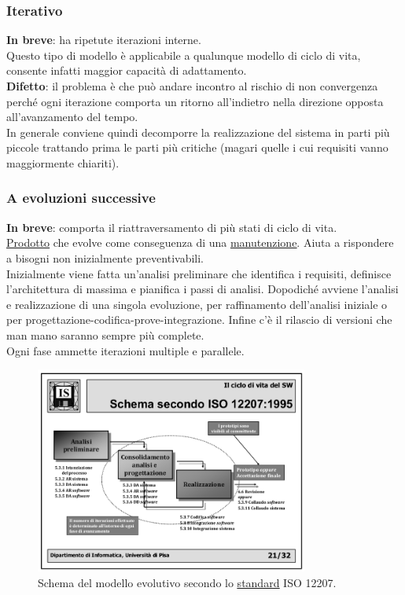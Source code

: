 			\subsubsection{Iterativo}  \label{miterativo}
			\textbf{In breve}: ha ripetute iterazioni interne. \\
			Questo tipo di modello è applicabile a qualunque modello di ciclo di vita, consente infatti maggior capacità di adattamento. \\
			\textbf{Difetto}: il problema è che può andare incontro al rischio di non convergenza perché ogni iterazione comporta un ritorno all'indietro nella direzione opposta all'avanzamento del tempo. \\
			In generale conviene quindi decomporre la realizzazione del sistema in parti più piccole trattando prima le parti più critiche (magari quelle i cui requisiti vanno maggiormente chiariti).

			\subsubsection{A evoluzioni successive} 
			\textbf{In breve}: comporta il riattraversamento di più stati di ciclo di vita. \\
			\underline{\hyperref[prodotto]{Prodotto}} che evolve come conseguenza di una \underline{\hyperref[manutenzione]{manutenzione}}.
			Aiuta a rispondere a bisogni non inizialmente preventivabili. \\
			Inizialmente viene fatta un'analisi preliminare che identifica i requisiti, definisce l'architettura di massima e pianifica i passi di analisi.
			Dopodiché avviene l'analisi e realizzazione di una singola evoluzione, per raffinamento dell'analisi iniziale o per progettazione-codifica-prove-integrazione.
			Infine c'è il rilascio di versioni che man mano saranno sempre più complete. \\
			Ogni fase ammette iterazioni multiple e parallele.

			 \begin{figure}[H]
			 	\centering
			 	\includegraphics[width=0.8\textwidth]{img/evoluzione}
			 	\caption{Schema del modello evolutivo secondo lo \underline{\hyperref[standard]{standard}} ISO 12207.}
			 \end{figure}

